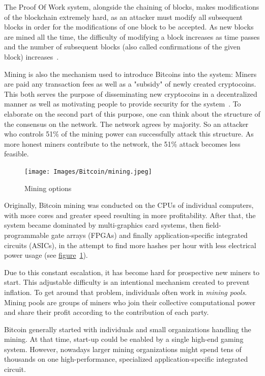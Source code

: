 The Proof Of Work system, alongside the chaining of blocks, makes modifications of the blockchain extremely hard, as an attacker must modify all subsequent blocks in order for the modifications of one block to be accepted. As new blocks are mined all the time, the difficulty of modifying a block increases as time passes and the number of subsequent blocks (also called confirmations of the given block) increases~\cite{economist}.

Mining is also the mechanism used to introduce Bitcoins into the system: Miners are paid any transaction fees as well as a "subsidy" of newly created cryptocoins. This both serves the purpose of disseminating new cryptocoins in a decentralized manner as well as motivating people to provide security for the system~\cite{wiki}. To elaborate on the second part of this purpose, one can think about the structure of the consensus on the network. The network agrees by majority. So an attacker who controls 51\% of the mining power can successfully attack this structure. As more honest miners contribute to the network, the 51\% attack becomes less feasible.

\begin{figure}
  \centering
  \texttt{[image: Images/Bitcoin/mining.jpeg]}
  \caption{Mining options}
  \label{fig:mining}
\end{figure}
Originally, Bitcoin mining was conducted on the CPUs of individual computers, with more cores and greater speed resulting in more profitability. After that, the system became dominated by multi-graphics card systems, then field-programmable gate arrays (FPGAs) and finally application-specific integrated circuits (ASICs), in the attempt to find more hashes per hour with less electrical power usage (see \hyperref[fig:mining]{figure}~\ref{fig:mining}).

Due to this constant escalation, it has become hard for prospective new miners to start. This adjustable difficulty is an intentional mechanism created to prevent inflation. To get around that problem, individuals often work in \emph{mining pools}. Mining pools are groups of miners who join their collective computational power and share their profit according to the contribution of each party.

Bitcoin generally started with individuals and small organizations handling the mining. At that time, start-up could be enabled by a single high-end gaming system. However, nowadays larger mining organizations might spend tens of thousands on one high-performance, specialized application-specific integrated circuit.

